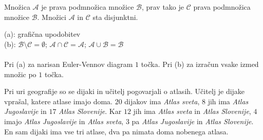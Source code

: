 \documentclass[addpoints]{exam}
\begin{document}
\begin{questions}
    \newpage
    \question
    Množica $\mathcal{A}$ je prava podmnožica množice $\mathcal{B}$, prav tako je $\mathcal{C}$ prava podmnožica množice $\mathcal{B}$. Množici $\mathcal{A}$ in $\mathcal{C}$ sta disjunktni.

    \begin{solution}[6cm]
        (a): grafična upodobitev \\
        (b): $\mathcal{B}\setminus\mathcal{C}=\emptyset$; $\mathcal{A}\cap\mathcal{C}=\mathcal{A}$; $\mathcal{A}\cup\mathcal{B}=\mathcal{B}$ \\ \\
        Pri (a) za narisan Euler-Vennov diagram $1$ točka. Pri (b) za izračun vsake izmed množic po $1$ točka.
    \end{solution}






    
    \question
    Pri uri geografije so se dijaki in učitelj pogovarjali o atlasih.  Učitelj je dijake vprašal, katere atlase imajo doma.
    $20$ dijakov ima \textit{Atlas sveta}, $8$ jih ima \textit{Atlas Jugoslavije} in $17$ \textit{Atlas Slovenije}. Kar $12$ jih ima \textit{Atlas sveta} in \textit{Atlas Slovenije}, $4$ imajo \textit{Atlas Jugoslavije} in \textit{Atlas sveta},
    $3$ pa \textit{Atlas Jugoslavije} in \textit{Atlas Slovenije}. En sam dijaki ima vse tri atlase, dva pa nimata doma nobenega atlasa. 
\end{questions}
\end{document}
